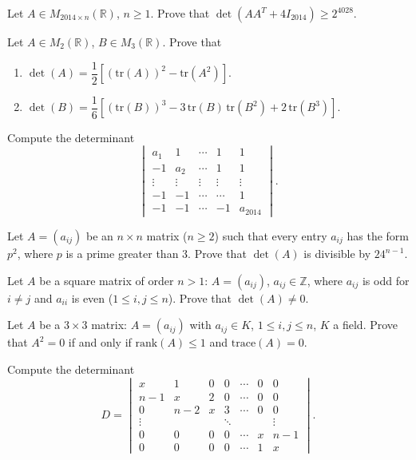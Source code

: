\documentclass[12pt]{article}
\begin{document}
\begin{problem}
Let $A\in M_{2014\times n}(\mathbb{R})$, $n\geq 1$. Prove that $\det(AA^T+4I_{2014}) \geq 2^{4028}$.
\end{problem}

\begin{problem}
Let $A\in M_2(\mathbb{R})$, $B\in M_3(\mathbb{R})$. Prove that
\begin{enumerate}[label=\alph*.]
\item $\det(A) = \dfrac12\left[(\mathrm{tr}(A))^2-\mathrm{tr}(A^2)\right]$.
\item $\det(B) = \dfrac16\left[(\mathrm{tr}(B))^3-3\,\mathrm{tr}(B)\,\mathrm{tr}(B^2)+2\,\mathrm{tr}(B^3)\right]$.
\end{enumerate}
\end{problem}

\begin{problem}
Compute the determinant
\[
\begin{vmatrix}
a_1 & 1 & \cdots & 1 & 1\\
-1 & a_2 & \cdots & 1 & 1\\
\vdots & \vdots & \vdots & \vdots & \vdots\\
-1 & -1 & \cdots & \cdots & 1\\
-1 & -1 & \cdots & -1 & a_{2014}
\end{vmatrix}.
\]
\end{problem}

\begin{problem}
Let $A=(a_{ij})$ be an $n\times n$ matrix ($n\geq 2$) such that every entry $a_{ij}$ has the form $p^2$, where $p$ is a prime greater than $3$. Prove that $\det(A)$ is divisible by $24^{n-1}$.
\end{problem}

\begin{problem}
Let $A$ be a square matrix of order $n>1$: $A=(a_{ij})$, $a_{ij}\in\mathbb{Z}$, where $a_{ij}$ is odd for $i\neq j$ and $a_{ii}$ is even ($1\leq i,j\leq n$). Prove that $\det(A)\neq 0$.
\end{problem}

\begin{problem}
Let $A$ be a $3\times 3$ matrix: $A=(a_{ij})$ with $a_{ij}\in K$, $1\leq i,j\leq n$, $K$ a field. Prove that $A^2=0$ if and only if $\mathrm{rank}(A)\leq 1$ and $\mathrm{trace}(A)=0$.
\end{problem}

\begin{problem}
Compute the determinant
\[
D = \begin{vmatrix}
x & 1 & 0 & 0 & \cdots & 0 & 0\\
n-1 & x & 2 & 0 & \cdots & 0 & 0\\
0 & n-2 & x & 3 & \cdots & 0 & 0\\
\vdots & & & \ddots & & & \vdots\\
0 & 0 & 0 & 0 & \cdots & x & n-1\\
0 & 0 & 0 & 0 & \cdots & 1 & x
\end{vmatrix}.
\]
\end{problem}
\end{document}
